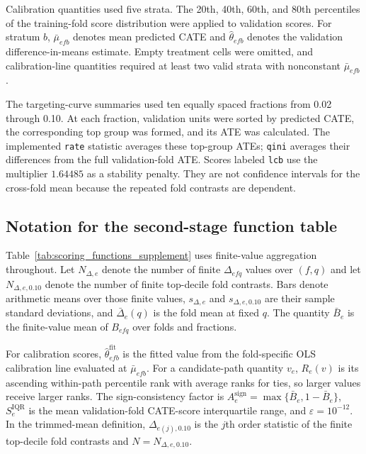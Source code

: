 \documentclass[12pt]{article}
\begin{document}
Calibration quantities used five strata. The 20th, 40th, 60th, and 80th percentiles of the training-fold score distribution were applied to validation scores. For stratum $b$, $\bar{\mu}_{efb}$ denotes mean predicted CATE and $\widehat{\theta}_{efb}$ denotes the validation difference-in-means estimate. Empty treatment cells were omitted, and calibration-line quantities required at least two valid strata with nonconstant $\bar{\mu}_{efb}$.

The targeting-curve summaries used ten equally spaced fractions from 0.02 through 0.10. At each fraction, validation units were sorted by predicted CATE, the corresponding top group was formed, and its ATE was calculated. The implemented \texttt{rate} statistic averages these top-group ATEs; \texttt{qini} averages their differences from the full validation-fold ATE. Scores labeled \texttt{lcb} use the multiplier $1.64485$ as a stability penalty. They are not confidence intervals for the cross-fold mean because the repeated fold contrasts are dependent.

\subsection{Notation for the second-stage function table}

Table~\ref{tab:scoring_functions_supplement} uses finite-value aggregation throughout. Let $N_{\Delta,e}$ denote the number of finite $\Delta_{efq}$ values over $(f,q)$ and let $N_{\Delta,e,0.10}$ denote the number of finite top-decile fold contrasts. Bars denote arithmetic means over those finite values, $s_{\Delta,e}$ and $s_{\Delta,e,0.10}$ are their sample standard deviations, and $\bar\Delta_e(q)$ is the fold mean at fixed $q$. The quantity $\bar B_e$ is the finite-value mean of $B_{efq}$ over folds and fractions.

For calibration scores, $\widehat{\theta}_{efb}^{\text{fit}}$ is the fitted value from the fold-specific OLS calibration line evaluated at $\bar{\mu}_{efb}$. For a candidate-path quantity $v_e$, $R_e(v)$ is its ascending within-path percentile rank with average ranks for ties, so larger values receive larger ranks. The sign-consistency factor is $A^{\mathrm{sign}}_e=\max\{\bar B_e,1-\bar B_e\}$, $S^{\mathrm{IQR}}_e$ is the mean validation-fold CATE-score interquartile range, and $\varepsilon=10^{-12}$. In the trimmed-mean definition, $\Delta_{e(j),0.10}$ is the $j$th order statistic of the finite top-decile fold contrasts and $N=N_{\Delta,e,0.10}$.
\end{document}
